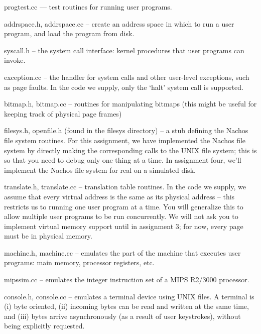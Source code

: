 \begin{description}

\item progtest.cc --- test routines for running user programs.

\item addrspace.h, addrspace.cc -- create an address space in which
to run a user program, and load the program from disk.

\item syscall.h -- the system call interface: kernel procedures that 
user programs can invoke.

\item exception.cc -- the handler for system calls and other user-level
exceptions, such as page faults.  In the code we supply, only the 
`halt' system call is supported.

\item bitmap.h, bitmap.cc -- routines for manipulating bitmaps
(this might be useful for keeping track of physical page frames)

\item filesys.h, openfile.h (found in the filesys directory) -- a stub 
defining the Nachos file system routines.
For this assignment, we have implemented the Nachos file system
by directly making the corresponding calls to the UNIX file system;
this is so that you need to debug only one thing at a time.
In assignment four, we'll implement the Nachos file system for real
on a simulated disk.  

\item translate.h, translate.cc -- translation table routines.  In the code
we supply, we assume that every virtual address is the same as its 
physical address -- this restricts us to running one user program at 
a time.  You will generalize this to allow multiple user programs to
be run concurrently.  We will not ask you to implement virtual 
memory support until in assignment 3; for now, every page must 
be in physical memory.  

\item machine.h, machine.cc -- emulates the part of the machine that
executes user programs: main memory, processor registers, etc.

\item mipssim.cc -- emulates the integer instruction set of a 
MIPS R2/3000 processor.

\item console.h, console.cc -- emulates a terminal device using UNIX files.
A terminal is (i) byte oriented, (ii) incoming bytes can be read and 
written at the same time, and (iii) bytes arrive asynchronously (as a 
result of user keystrokes), without being explicitly requested.  

\end{description}

